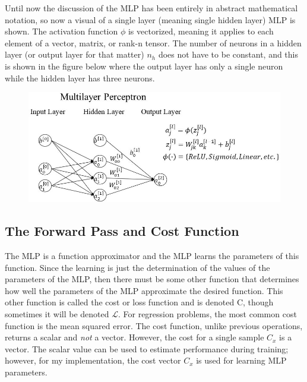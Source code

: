 \documentclass{article}
\begin{document}
Until now the discussion of the MLP has been entirely in abstract mathematical
notation, so now a visual of a single layer (meaning single hidden layer)
MLP is shown. The activation function $\phi$ is vectorized, meaning it
applies to each element of a vector, matrix, or rank-n tensor. The number of
neurons in a hidden layer (or output layer for that matter) $n_h$ does not have
to be constant, and this is shown in the figure below where the output layer
has only a single neuron while the hidden layer has three neurons.

\begin{figure}[h]
	\includegraphics[scale=0.60]{mlp_larger_font_croppped.jpg}
\end{figure}


\subsection{The Forward Pass and Cost Function}
\quad The MLP is a function approximator and the MLP learns the parameters of
this function. Since the learning is just the determination of the values of the
parameters of the MLP, then there must be some other function that determines
how well the parameters of the MLP approximate the desired function. This other
function is called the cost or loss function and is denoted C, though sometimes
it will be denoted $\mathcal{L}$. For regression problems, the most common
cost function is the mean squared error. The cost function, unlike previous
operations, returns a scalar and \textit{not} a vector. However, the cost for
a single sample $C_x$ is a vector. The scalar value can be used to estimate
performance during training; however, for my implementation, the cost vector
$C_x$ is used for learning MLP parameters.
\end{document}
